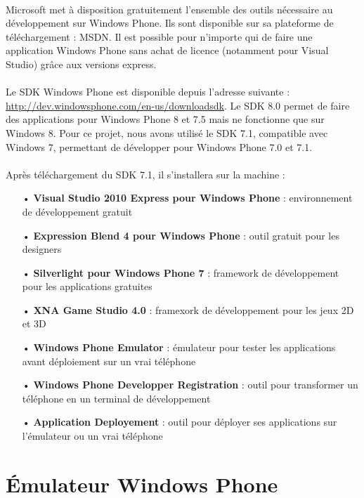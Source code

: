 \documentclass[twoside,UTF8]{EPURapport}
\begin{document}
\paragraph{}
Microsoft met à disposition gratuitement l'ensemble des outils nécessaire au développement sur Windows Phone. 	Ils sont disponible sur sa plateforme de téléchargement : MSDN. Il est possible pour n'importe qui de faire une application Windows Phone sans achat de licence (notamment pour Visual Studio) grâce aux versions express. 
	
\paragraph{}
Le SDK Windows Phone est disponible depuis l'adresse suivante :       \url{http://dev.windowsphone.com/en-us/downloadsdk}. Le SDK 8.0 permet de faire des applications pour Windows Phone 8 et 7.5 mais ne fonctionne que sur Windows 8. Pour ce projet, nous avons utilisé le SDK 7.1, compatible avec Windows 7, permettant de développer pour Windows Phone 7.0 et 7.1. 

\paragraph{}
Après téléchargement du SDK 7.1, il s'installera sur la machine : 
\begin{itemize}
	\item[•]\textbf{Visual Studio 2010 Express pour Windows Phone} : environnement de développement gratuit
	\item[•]\textbf{Expression Blend 4 pour Windows Phone} : outil gratuit pour les designers
	\item[•]\textbf{Silverlight pour Windows Phone 7} : framework de développement pour les applications gratuites
	\item[•]\textbf{XNA Game Studio 4.0} : framexork de développement pour les jeux 2D et 3D
	\item[•]\textbf{Windows Phone Emulator} : émulateur pour tester les applications avant déploiement sur un vrai téléphone
	\item[•]\textbf{Windows Phone Developper Registration} : outil pour transformer un téléphone en un terminal de développement
	\item[•]\textbf{Application Deployement} : outil pour déployer ses applications sur l'émulateur ou un vrai téléphone
\end{itemize}
	
	\section{\'Emulateur Windows Phone}
\end{document}
